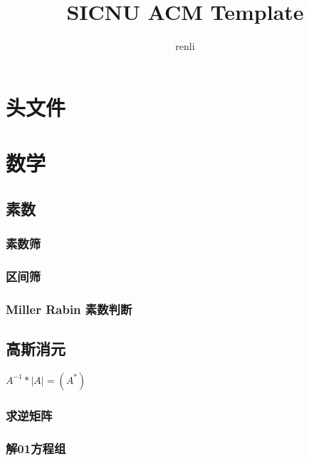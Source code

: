 \documentclass[twocolumn,a4]{article}%
\title{\CJKfamily{hei} \bfseries SICNU ACM Template}
\author{renli}
\begin{document}
\small
\begin{titlepage}
\maketitle
\end{titlepage}

\newpage
\pagestyle{empty}
\renewcommand{\contentsname}{目录}
\tableofcontents %
\newpage\clearpage
\newpage
\pagestyle{fancy}
\setcounter{page}{1}   %

\section{头文件}

\section{数学}
\subsection{素数}
    \subsubsection{素数筛}
    
    \subsubsection{区间筛}
    
    \subsubsection{Miller Rabin 素数判断}
    
\subsection{高斯消元}
    $A^{-1} * |A| = (A^*)$
    \subsubsection{求逆矩阵}
    
    \subsubsection{解01方程组}
    
\end{document}
